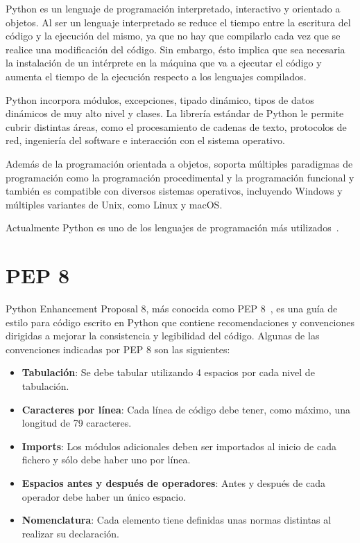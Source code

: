\documentclass[a4paper, 12pt]{book}
\begin{document}
Python es un lenguaje de programación interpretado, interactivo y orientado a objetos. Al ser un lenguaje interpretado se reduce el tiempo entre la escritura del código y la ejecución del mismo, ya que no hay que compilarlo cada vez que se realice una modificación del código. Sin embargo, ésto implica que sea necesaria la instalación de un intérprete en la máquina que va a ejecutar el código y aumenta el tiempo de la ejecución respecto a los lenguajes compilados.

Python incorpora módulos, excepciones, tipado dinámico, tipos de datos dinámicos de muy alto nivel y clases. La librería estándar de Python le permite cubrir distintas áreas, como el procesamiento de cadenas de texto, protocolos de red, ingeniería del software e interacción con el sistema operativo.

Además de la programación orientada a objetos, soporta múltiples paradigmas de programación como la programación procedimental y la programación funcional y también es compatible con diversos sistemas operativos, incluyendo Windows y múltiples variantes de Unix, como Linux y macOS.

Actualmente Python es uno de los lenguajes de programación más utilizados~\cite{stackoverflowsurvey}.

\section{PEP 8} 
\label{sec:pep8}
Python Enhancement Proposal 8, más conocida como PEP 8~\cite{pep8}, es una guía de estilo para código escrito en Python que contiene recomendaciones y convenciones dirigidas a mejorar la consistencia y legibilidad del código.
Algunas de las convenciones indicadas por PEP 8 son las siguientes:
\begin{itemize}
	\item \textbf{Tabulación}: Se debe tabular utilizando 4 espacios por cada nivel de tabulación.
	\item \textbf{Caracteres por línea}: Cada línea de código debe tener, como máximo, una longitud de 79 caracteres.
	\item \textbf{Imports}: Los módulos adicionales deben ser importados al inicio de cada fichero y sólo debe haber uno por línea.
	\item \textbf{Espacios antes y después de operadores}: Antes y después de cada operador debe haber un único espacio.
	\item \textbf{Nomenclatura}: Cada elemento tiene definidas unas normas distintas al realizar su declaración.
\end{itemize}
\end{document}
